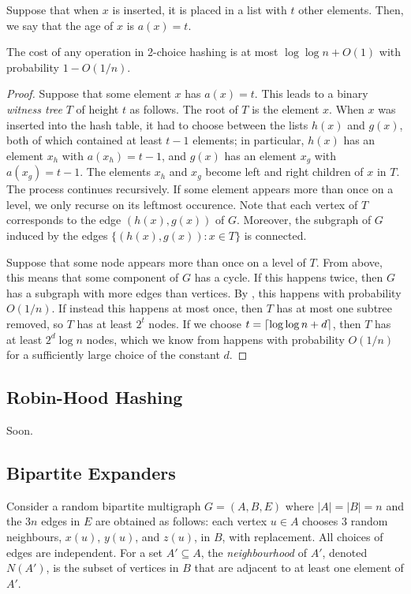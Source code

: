 \documentclass{patmorin}
\begin{document}
Suppose that when $x$ is inserted, it is placed in a list with $t$
other elements. Then, we say that the age of $x$ is $a(x) = t$.
\begin{thm}
  The cost of any operation in 2-choice hashing is at most
  $\log \log n + O(1)$ with probability $1 - O(1/n)$.
\end{thm}
\begin{proof}
  Suppose that some element $x$ has $a(x) = t$. This leads to a binary
  \emph{witness tree} $T$ of height $t$ as follows.
  The root of $T$ is the element $x$. When $x$ was inserted into the
  hash table, it had to choose between the lists $h(x)$ and $g(x)$,
  both of which contained at least $t - 1$ elements; in particular,
  $h(x)$ has an element $x_h$ with $a(x_h) = t - 1$, and $g(x)$ has an
  element $x_g$ with $a(x_g) = t - 1$. The elements $x_h$ and $x_g$
  become left and right children of $x$ in $T$. The process continues
  recursively. If some element appears more than once on a level, we
  only recurse on its leftmost occurence. Note that each vertex of $T$ corresponds to the edge $(h(x), g(x))$
  of $G$. Moreover, the subgraph of $G$ induced by the edges
  $\{(h(x), g(x)) : x \in T\}$ is connected.

  Suppose that some node appears more than once on a level of
  $T$. From above, this means that some component of $G$ has a
  cycle. If this happens twice, then $G$ has a subgraph with more
  edges than vertices. By , this happens
  with probability $O(1/n)$. If instead this happens at most once,
  then $T$ has at most one subtree removed, so $T$ has at least $2^t$
  nodes. If we choose $t = {\lceil \log \log n + d \rceil}$, then $T$ has at least
  $2^d \log n$ nodes, which we know from
   happens with probability $O(1/n)$
  for a sufficiently large choice of the constant $d$.
\end{proof}

\subsection{Robin-Hood Hashing}

Soon.


\subsection{Bipartite Expanders}

Consider a random bipartite multigraph $G=(A,B,E)$ where $|A|=|B|=n$
and the $3n$ edges in $E$ are obtained as follows:  each vertex $u\in A$
chooses 3 random neighbours, $x(u)$, $y(u)$, and $z(u)$, in $B$, with
replacement.  All choices of edges are independent. For a set $A'\subseteq
A$, the \emph{neighbourhood} of $A'$, denoted $N(A')$, is the subset of
vertices in $B$ that are adjacent to at least one element of $A'$.
\end{document}
